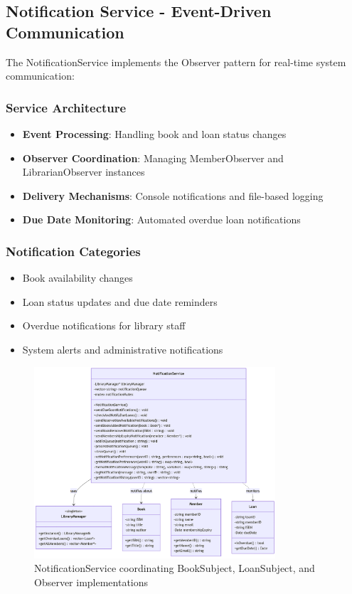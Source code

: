 \subsection{Notification Service - Event-Driven Communication}

The NotificationService implements the Observer pattern for real-time system communication:

\subsubsection{Service Architecture}
\begin{itemize}
	\item \textbf{Event Processing}: Handling book and loan status changes
	\item \textbf{Observer Coordination}: Managing MemberObserver and LibrarianObserver instances
	\item \textbf{Delivery Mechanisms}: Console notifications and file-based logging
	\item \textbf{Due Date Monitoring}: Automated overdue loan notifications
\end{itemize}

\subsubsection{Notification Categories}
\begin{itemize}
	\item Book availability changes
	\item Loan status updates and due date reminders
	\item Overdue notifications for library staff
	\item System alerts and administrative notifications
\end{itemize}

\begin{figure}[H]
	\centering
	\includegraphics[width=0.8\textwidth]{figures/notification_service.png}
	\caption{NotificationService coordinating BookSubject, LoanSubject, and Observer implementations}
	\label{fig:notification-service}
\end{figure}

